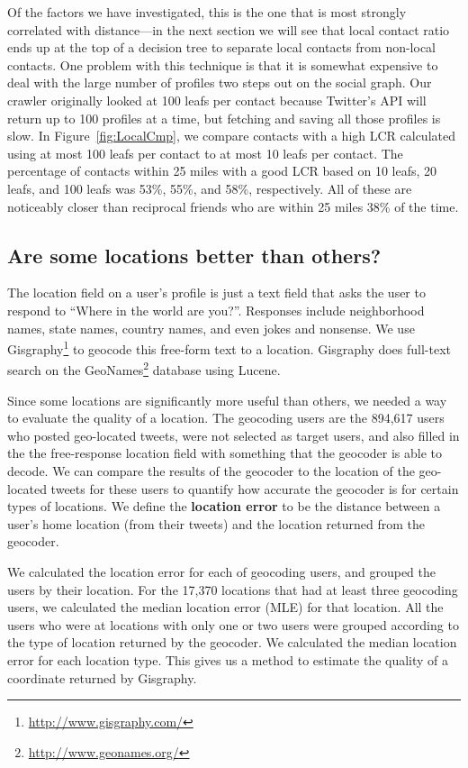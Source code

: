 \documentclass[letterpaper]{article}
\begin{document}
Of the factors we have investigated, this is the one that is most strongly
correlated with distance---in the next section we will see that local contact
ratio ends up at the top of a decision tree to separate local contacts from
non-local contacts.
%
One problem with this technique is that it is somewhat expensive to deal with
the large number of profiles two steps out on the social graph.
%
Our crawler originally looked at 100 leafs per contact because Twitter's API
will return up to 100 profiles at a time, but fetching and saving all those
profiles is slow.
%
In Figure~\ref{fig:LocalCmp}, we compare contacts with a high LCR calculated
using at most 100 leafs per contact to at most 10 leafs per contact.
%
The percentage of contacts within 25 miles with a good LCR based on 10 leafs,
20 leafs, and 100 leafs was 53\%, 55\%, and 58\%, respectively.
%
All of these are noticeably closer than reciprocal friends who are within 25
miles 38\% of the time.


\subsection{Are some locations better than others?}
The location field on a user's profile is just a text field that asks the user
to respond to ``Where in the world are you?''.
%
Responses include neighborhood names, state names, country names, and even
jokes and nonsense.
%
We use Gisgraphy\footnote{\url{http://www.gisgraphy.com/}} to geocode this
free-form text to a location.
%
Gisgraphy does full-text search on the
GeoNames\footnote{\url{http://www.geonames.org/}} database using Lucene.

Since some locations are significantly more useful than others, we needed a way
to evaluate the quality of a location.
%
The geocoding users are the 894,617 users who posted geo-located tweets, were not
selected as target users, and also filled in the the free-response location
field with something that the geocoder is able to decode.
%
We can compare the results of the geocoder to the location of the geo-located
tweets for these users to quantify how accurate the geocoder is for certain
types of locations.
%
We define the \textbf{location error} to be the distance between a user's home
location (from their tweets) and the location returned from the geocoder.

We calculated the location error for each of geocoding users, and grouped the
users by their location.
%
For the 17,370 locations that had at least three geocoding users, we calculated
the median location error (MLE) for that location.
%
All the users who were at locations with only one or two users were grouped
according to the type of location returned by the geocoder.
%
We calculated the median location error for each location type.
%
%
%
This gives us a method to estimate the quality of a coordinate returned by
Gisgraphy.
\end{document}
